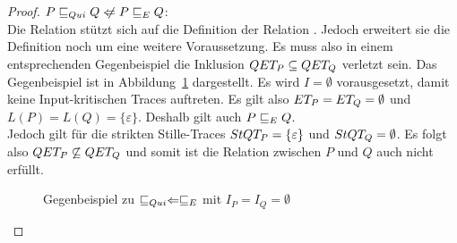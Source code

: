 \begin{proof}
  $P \QRel Q \hspace{0.1cm}\not\hspace{-0.1cm}\Leftarrow P \ERel Q$:\\
  Die Relation \QRel{} stützt sich auf die Definition der Relation \ERel{}.
  Jedoch erweitert sie die Definition noch um eine weitere Voraussetzung. Es
  muss also in einem entsprechenden Gegenbeispiel die Inklusion $QET _P
  \subseteq QET _Q$ verletzt sein. Das Gegenbeispiel ist in
  Abbildung~\ref{QuiEGegenBsp} dargestellt. Es wird $I = \emptyset$
  vorausgesetzt, damit keine Input-kritischen Traces auftreten. Es gilt also
  $ET _P = ET _Q = \emptyset$ und $L(P) = L(Q) = \{\varepsilon\}$. Deshalb
  gilt auch $P \sqsubseteq  _E Q$.\\
  Jedoch gilt für die strikten Stille-Traces $StQT _P = \{\varepsilon\}$ und
  $StQT _Q = \emptyset$. Es folgt also $QET _P \not\subseteq QET _Q$ und
  somit ist die Relation \QRel{} zwischen $P$ und $Q$ auch nicht erfüllt.

  \begin{figure}[htbp]
    \begin{center}
      \caption{Gegenbeispiel zu $ \sqsubseteq  _{Qui} \Leftarrow  \sqsubseteq  _E$ mit $I_P = I_Q =
      \emptyset$}
      \label{QuiEGegenBsp}
    \end{center}
  \end{figure}
\end{proof}

